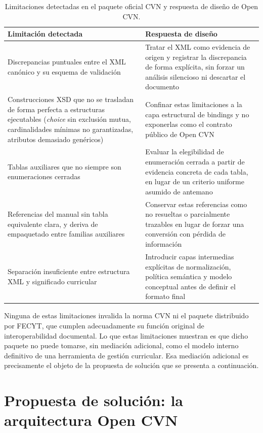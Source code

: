 \begin{table}[htbp]
  \centering
  \footnotesize
  \renewcommand{\arraystretch}{1.55}
  \caption{Limitaciones detectadas en el paquete oficial CVN y respuesta de diseño de Open CVN.}
  \label{tab:ecosistema_limitaciones}
  \begin{tabular}{p{} p{}}
    \hline
    \textbf{Limitación detectada} & \textbf{Respuesta de diseño} \\
    \hline
    Discrepancias puntuales entre el XML canónico y su esquema de validación & Tratar el XML como evidencia de origen y registrar la discrepancia de forma explícita, sin forzar un análisis silencioso ni descartar el documento \\
    Construcciones XSD que no se trasladan de forma perfecta a estructuras ejecutables (\textit{choice} sin exclusión mutua, cardinalidades mínimas no garantizadas, atributos demasiado genéricos) & Confinar estas limitaciones a la capa estructural de bindings y no exponerlas como el contrato público de Open CVN \\
    Tablas auxiliares que no siempre son enumeraciones cerradas & Evaluar la elegibilidad de enumeración cerrada a partir de evidencia concreta de cada tabla, en lugar de un criterio uniforme asumido de antemano \\
    Referencias del manual sin tabla equivalente clara, y deriva de empaquetado entre familias auxiliares & Conservar estas referencias como no resueltas o parcialmente trazables en lugar de forzar una conversión con pérdida de información \\
    Separación insuficiente entre estructura XML y significado curricular & Introducir capas intermedias explícitas de normalización, política semántica y modelo conceptual antes de definir el formato final \\
    \hline
  \end{tabular}
\end{table}

Ninguna de estas limitaciones invalida la norma CVN ni el paquete distribuido
por FECYT, que cumplen adecuadamente su función original de interoperabilidad
documental. Lo que estas limitaciones muestran es que dicho paquete no puede
tomarse, sin mediación adicional, como el modelo interno definitivo de una
herramienta de gestión curricular. Esa mediación adicional es precisamente el
objeto de la propuesta de solución que se presenta a continuación.

\section{Propuesta de solución: la arquitectura Open CVN}
\label{sec:ecosistema_propuesta}


